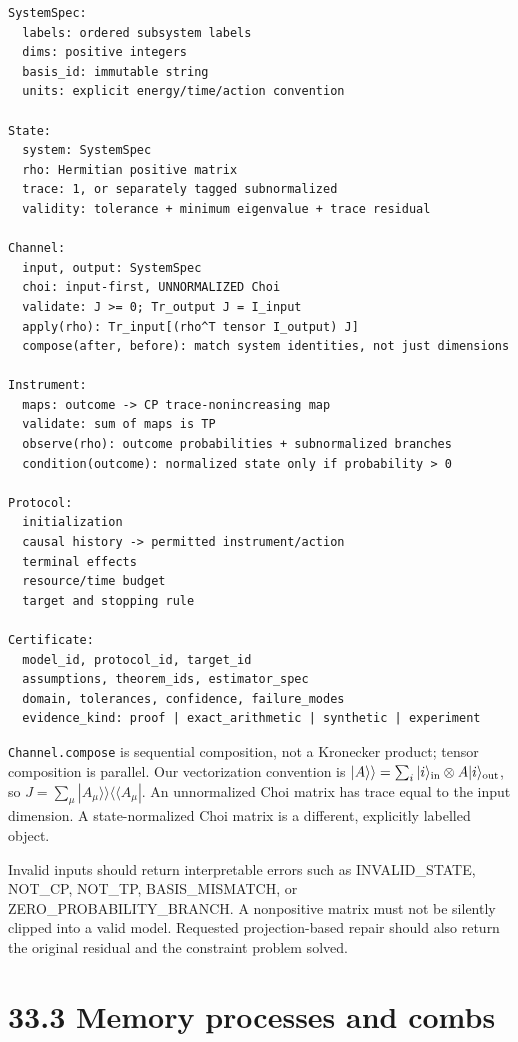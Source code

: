 \documentclass[
  11pt,
  oneside]{book}
\begin{document}
\begin{Verbatim}[breaklines,breakanywhere,fontsize=\scriptsize]
SystemSpec:
  labels: ordered subsystem labels
  dims: positive integers
  basis_id: immutable string
  units: explicit energy/time/action convention

State:
  system: SystemSpec
  rho: Hermitian positive matrix
  trace: 1, or separately tagged subnormalized
  validity: tolerance + minimum eigenvalue + trace residual

Channel:
  input, output: SystemSpec
  choi: input-first, UNNORMALIZED Choi
  validate: J >= 0; Tr_output J = I_input
  apply(rho): Tr_input[(rho^T tensor I_output) J]
  compose(after, before): match system identities, not just dimensions

Instrument:
  maps: outcome -> CP trace-nonincreasing map
  validate: sum of maps is TP
  observe(rho): outcome probabilities + subnormalized branches
  condition(outcome): normalized state only if probability > 0

Protocol:
  initialization
  causal history -> permitted instrument/action
  terminal effects
  resource/time budget
  target and stopping rule

Certificate:
  model_id, protocol_id, target_id
  assumptions, theorem_ids, estimator_spec
  domain, tolerances, confidence, failure_modes
  evidence_kind: proof | exact_arithmetic | synthetic | experiment
\end{Verbatim}

\texttt{Channel.\allowbreak compose} is sequential composition, not a Kronecker
product; tensor composition is parallel. Our vectorization convention is
\(|A\rangle\rangle=\sum_i|i\rangle_{\rm in}\otimes A|i\rangle_{\rm out}\),
so \(J=\sum_\mu|A_\mu\rangle\rangle\langle\langle A_\mu|\). An
unnormalized Choi matrix has trace equal to the input dimension. A
state-normalized Choi matrix is a different, explicitly labelled object.

Invalid inputs should return interpretable errors such as
INVALID\_\allowbreak STATE, NOT\_\allowbreak CP, NOT\_\allowbreak TP, BASIS\_\allowbreak MISMATCH, or
ZERO\_\allowbreak PROBABILITY\_\allowbreak BRANCH. A nonpositive matrix must not be silently
clipped into a valid model. Requested projection-based repair should
also return the original residual and the constraint problem solved.

\section{33.3 Memory processes and combs}
\end{document}
